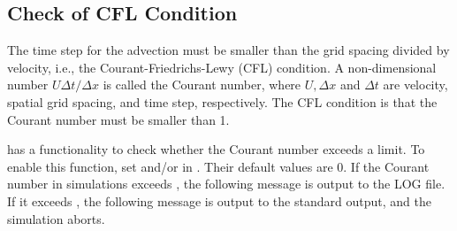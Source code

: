 \subsection{Check of CFL Condition} \label{subsec:cfl_check}

The time step for the advection  must be smaller than the grid spacing divided by velocity, i.e., the Courant-Friedrichs-Lewy (CFL) condition.
A non-dimensional number $U \Delta t/\Delta x$ is called the Courant number, where $U, \Delta x$ and $\Delta t$ are velocity, spatial grid spacing, and time step, respectively.
The CFL condition is that the Courant number must be smaller than 1.

\scalerm has a functionality to check whether the Courant number exceeds a limit.
To enable this function, set  and/or  in .
Their default values are 0.
If the Courant number in simulations exceeds , the following message is output to the LOG file.
If it exceeds , the following message is output to the standard output, and the simulation aborts.
